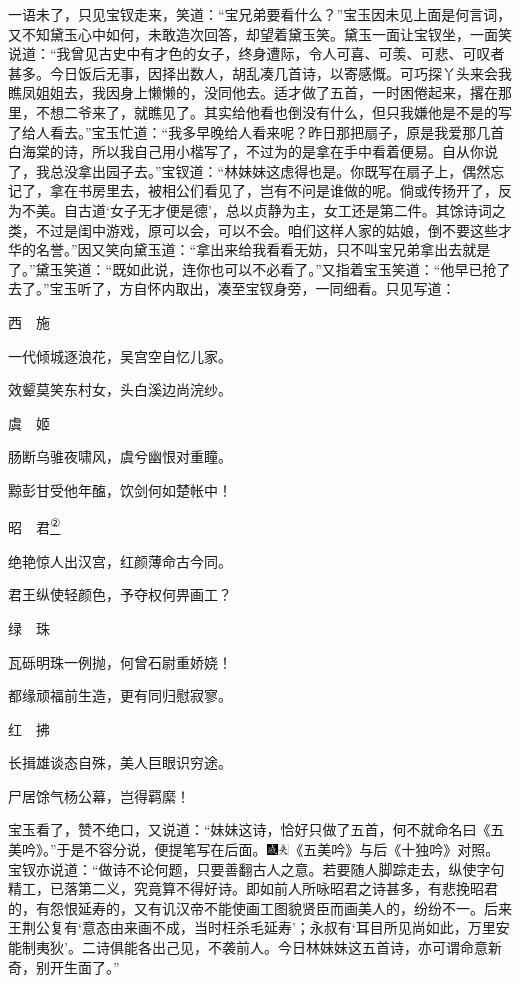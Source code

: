 一语未了，只见宝钗走来，笑道：``宝兄弟要看什么？''宝玉因未见上面是何言词，又不知黛玉心中如何，未敢造次回答，却望着黛玉笑。黛玉一面让宝钗坐，一面笑说道：``我曾见古史中有才色的女子，终身遭际，令人可喜、可羡、可悲、可叹者甚多。今日饭后无事，因择出数人，胡乱凑几首诗，以寄感慨。可巧探丫头来会我瞧凤姐姐去，我因身上懒懒的，没同他去。适才做了五首，一时困倦起来，撂在那里，不想二爷来了，就瞧见了。其实给他看也倒没有什么，但只我嫌他是不是的写了给人看去。''宝玉忙道：``我多早晚给人看来呢？昨日那把扇子，原是我爱那几首白海棠的诗，所以我自己用小楷写了，不过为的是拿在手中看着便易。自从你说了，我总没拿出园子去。''宝钗道：``林妹妹这虑得也是。你既写在扇子上，偶然忘记了，拿在书房里去，被相公们看见了，岂有不问是谁做的呢。倘或传扬开了，反为不美。自古道`女子无才便是德'，总以贞静为主，女工还是第二件。其馀诗词之类，不过是闺中游戏，原可以会，可以不会。咱们这样人家的姑娘，倒不要这些才华的名誉。''因又笑向黛玉道：``拿出来给我看看无妨，只不叫宝兄弟拿出去就是了。''黛玉笑道：``既如此说，连你也可以不必看了。''又指着宝玉笑道：``他早已抢了去了。''宝玉听了，方自怀内取出，凑至宝钗身旁，一同细看。只见写道：

西　施

一代倾城逐浪花，吴宫空自忆儿家。

效颦莫笑东村女，头白溪边尚浣纱。

虞　姬

肠断乌骓夜啸风，虞兮幽恨对重瞳。

黥彭甘受他年醢，饮剑何如楚帐中！

昭　君\href{../Text/part0068_split_000.html\#lnkback_2_a}{\textsuperscript{②}}

绝艳惊人出汉宫，红颜薄命古今同。

君王纵使轻颜色，予夺权何畀画工？

绿　珠

瓦砾明珠一例抛，何曾石尉重娇娆！

都缘顽福前生造，更有同归慰寂寥。

红　拂

长揖雄谈态自殊，美人巨眼识穷途。

尸居馀气杨公幕，岂得羁縻！

宝玉看了，赞不绝口，又说道：``妹妹这诗，恰好只做了五首，何不就命名曰《五美吟》。''于是不容分说，便提笔写在后面。{\includegraphics[width=3mm]{../Images/00005}\includegraphics[width=3mm]{../Images/00012}\footnotesize \kaishu 《五美吟》与后《十独吟》对照。}宝钗亦说道：``做诗不论何题，只要善翻古人之意。若要随人脚踪走去，纵使字句精工，已落第二义，究竟算不得好诗。即如前人所咏昭君之诗甚多，有悲挽昭君的，有怨恨延寿的，又有讥汉帝不能使画工图貌贤臣而画美人的，纷纷不一。后来王荆公复有`意态由来画不成，当时枉杀毛延寿'；永叔有`耳目所见尚如此，万里安能制夷狄'。二诗俱能各出己见，不袭前人。今日林妹妹这五首诗，亦可谓命意新奇，别开生面了。''

